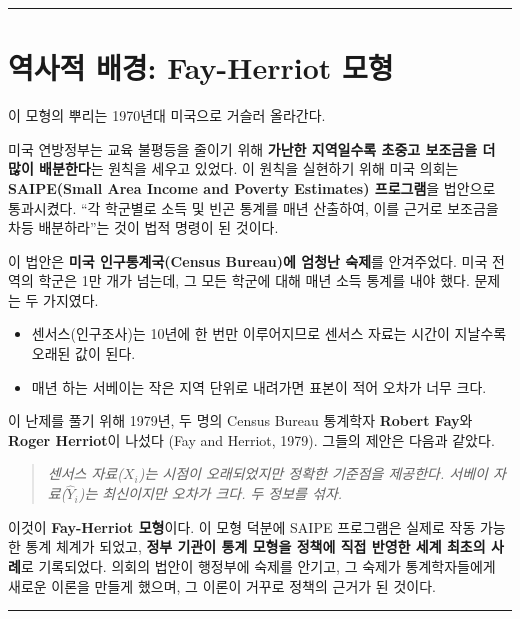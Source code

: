 \documentclass[
  letterpaper,
  DIV=11,
  numbers=noendperiod]{scrreprt}
\providecommand{\tightlist}{%
  \setlength{\itemsep}{0pt}\setlength{\parskip}{0pt}}
\begin{document}
\begin{center}\rule{0.5\linewidth}{0.5pt}\end{center}

\section{역사적 배경: Fay-Herriot
모형}\label{uxc5eduxc0acuxc801-uxbc30uxacbd-fay-herriot-uxbaa8uxd615}

이 모형의 뿌리는 1970년대 미국으로 거슬러 올라간다.

미국 연방정부는 교육 불평등을 줄이기 위해 \textbf{가난한 지역일수록
초중고 보조금을 더 많이 배분한다}는 원칙을 세우고 있었다. 이 원칙을
실현하기 위해 미국 의회는 \textbf{SAIPE(Small Area Income and Poverty
Estimates) 프로그램}을 법안으로 통과시켰다. ``각 학군별로 소득 및 빈곤
통계를 매년 산출하여, 이를 근거로 보조금을 차등 배분하라''는 것이 법적
명령이 된 것이다.

이 법안은 \textbf{미국 인구통계국(Census Bureau)에 엄청난 숙제}를
안겨주었다. 미국 전역의 학군은 1만 개가 넘는데, 그 모든 학군에 대해 매년
소득 통계를 내야 했다. 문제는 두 가지였다.

\begin{itemize}
\tightlist
\item
  센서스(인구조사)는 10년에 한 번만 이루어지므로 센서스 자료는 시간이
  지날수록 오래된 값이 된다.
\item
  매년 하는 서베이는 작은 지역 단위로 내려가면 표본이 적어 오차가 너무
  크다.
\end{itemize}

이 난제를 풀기 위해 1979년, 두 명의 Census Bureau 통계학자
\textbf{Robert Fay}와 \textbf{Roger Herriot}이 나섰다 (Fay and Herriot,
1979). 그들의 제안은 다음과 같았다.

\begin{quote}
\emph{센서스 자료(\(X_i\))는 시점이 오래되었지만 정확한 기준점을
제공한다. 서베이 자료(\(\hat{Y}_i\))는 최신이지만 오차가 크다. 두 정보를
섞자.}
\end{quote}

이것이 \textbf{Fay-Herriot 모형}이다. 이 모형 덕분에 SAIPE 프로그램은
실제로 작동 가능한 통계 체계가 되었고, \textbf{정부 기관이 통계 모형을
정책에 직접 반영한 세계 최초의 사례}로 기록되었다. 의회의 법안이
행정부에 숙제를 안기고, 그 숙제가 통계학자들에게 새로운 이론을 만들게
했으며, 그 이론이 거꾸로 정책의 근거가 된 것이다.

\begin{center}\rule{0.5\linewidth}{0.5pt}\end{center}
\end{document}
